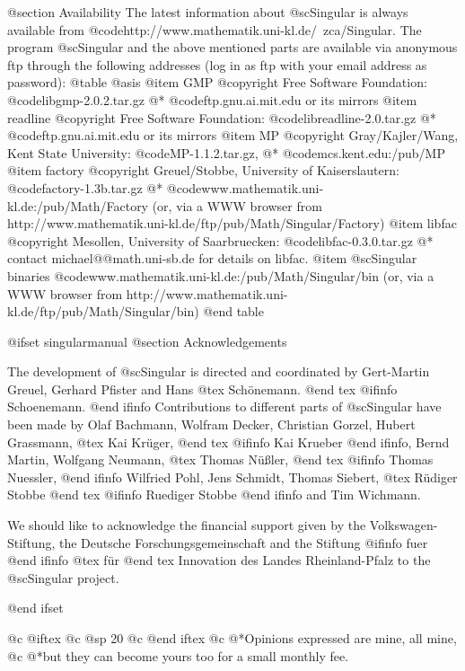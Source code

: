 @section Availability
The latest information about @sc{Singular} is always available from
@code{http://www.mathematik.uni-kl.de/~zca/Singular}.
The program @sc{Singular} and the above mentioned parts are available via
anonymous ftp through the following addresses
(log in as ftp with your email address as password):
@table @asis
@item GMP
@copyright{} Free Software Foundation:
@code{libgmp-2.0.2.tar.gz}
@* @code{ftp.gnu.ai.mit.edu} or its mirrors
@item readline
@copyright{} Free Software Foundation:
@code{libreadline-2.0.tar.gz}
@* @code{ftp.gnu.ai.mit.edu} or its mirrors
@item MP
@copyright{} Gray/Kajler/Wang, Kent State University:
@code{MP-1.1.2.tar.gz},
@* @code{mcs.kent.edu:/pub/MP}
@item factory
@copyright{} Greuel/Stobbe, University of Kaiserslautern:
@code{factory-1.3b.tar.gz}
@* @code{www.mathematik.uni-kl.de:/pub/Math/Factory}
(or, via a WWW browser from http://www.mathematik.uni-kl.de/ftp/pub/Math/Singular/Factory)
@item libfac
@copyright{}  Mesollen, University  of Saarbruecken:
@code{libfac-0.3.0.tar.gz}
@* contact michael@@math.uni-sb.de for details on libfac.
@item @sc{Singular} binaries
@code{www.mathematik.uni-kl.de:/pub/Math/Singular/bin}
(or, via a WWW browser from http://www.mathematik.uni-kl.de/ftp/pub/Math/Singular/bin)
@end table

@ifset singularmanual
@section Acknowledgements

The development of @sc{Singular} is directed and coordinated by
Gert-Martin Greuel, Gerhard Pfister and Hans
@tex
 Sch\"onemann.
@end tex
@ifinfo
 Schoenemann.
@end ifinfo
Contributions to different parts of @sc{Singular} have been made by
Olaf Bachmann,
Wolfram Decker,
Christian Gorzel,
Hubert Grassmann,
@tex
Kai Kr\"uger,
@end tex
@ifinfo
Kai Krueber
@end ifinfo,
Bernd Martin,
Wolfgang Neumann,
@tex
Thomas N\"u{\ss}ler,
@end tex
@ifinfo
Thomas Nuessler,
@end ifinfo
Wilfried Pohl,
Jens Schmidt,
Thomas Siebert,
@tex
R\"udiger Stobbe
@end tex
@ifinfo
Ruediger Stobbe
@end ifinfo
and
Tim Wichmann.

We should like to acknowledge the financial support given by
the Volkswagen-Stiftung,
the Deutsche Forschungsgemeinschaft
and the Stiftung
@ifinfo
fuer
@end ifinfo
@tex
f\"ur
@end tex
 Innovation des Landes Rheinland-Pfalz
to the
@sc{Singular} project.

@end ifset

@c @iftex
@c @sp 20
@c @end iftex
@c @*Opinions expressed are mine,  all mine,
@c @*but they can become yours too for a small monthly fee.
